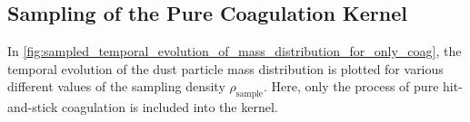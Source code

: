 







    \cleardoublepage\subsection{Sampling of the Pure Coagulation Kernel}

        In \cref{fig:sampled_temporal_evolution_of_mass_distribution_for_only_coag}, the 
        temporal evolution of the dust particle mass distribution is plotted for 
        various different values of the sampling density $\rho_\text{sample}$. Here, 
        only the process of pure hit-and-stick coagulation is included into the kernel. \\

